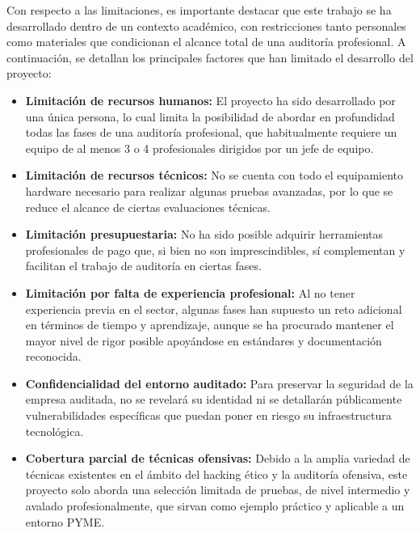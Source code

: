 \documentclass[a4paper, 11pt]{article}
\begin{document}
Con respecto a las limitaciones, es importante destacar que este trabajo se ha desarrollado dentro de un contexto académico, con restricciones tanto personales como materiales que condicionan el alcance total de una auditoría profesional. A continuación, se detallan los principales factores que han limitado el desarrollo del proyecto:

\begin{itemize}
    \item \textbf{Limitación de recursos humanos:} El proyecto ha sido desarrollado por una única persona, lo cual limita la posibilidad de abordar en profundidad todas las fases de una auditoría profesional, que habitualmente requiere un equipo de al menos 3 o 4 profesionales dirigidos por un jefe de equipo.

    \item \textbf{Limitación de recursos técnicos:} No se cuenta con todo el equipamiento hardware necesario para realizar algunas pruebas avanzadas, por lo que se reduce el alcance de ciertas evaluaciones técnicas.

    \item \textbf{Limitación presupuestaria:} No ha sido posible adquirir herramientas profesionales de pago que, si bien no son imprescindibles, sí complementan y facilitan el trabajo de auditoría en ciertas fases.


    \item \textbf{Limitación por falta de experiencia profesional:} Al no tener experiencia previa en el sector, algunas fases han supuesto un reto adicional en términos de tiempo y aprendizaje, aunque se ha procurado mantener el mayor nivel de rigor posible apoyándose en estándares y documentación reconocida.

    \item \textbf{Confidencialidad del entorno auditado:} Para preservar la seguridad de la empresa auditada, no se revelará su identidad ni se detallarán públicamente vulnerabilidades específicas que puedan poner en riesgo su infraestructura tecnológica.

    \item \textbf{Cobertura parcial de técnicas ofensivas:} Debido a la amplia variedad de técnicas existentes en el ámbito del hacking ético y la auditoría ofensiva, este proyecto solo aborda una selección limitada de pruebas, de nivel intermedio y avalado profesionalmente, que sirvan como ejemplo práctico y aplicable a un entorno PYME.
\end{itemize}
\end{document}
